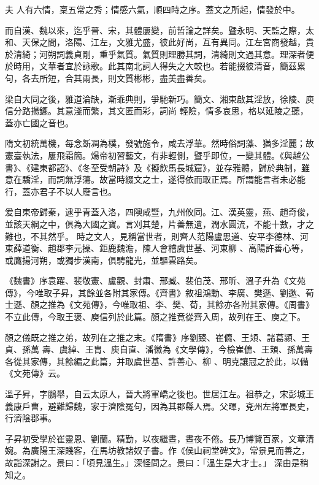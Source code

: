 \begin{pinyinscope}
 夫
 人有六情，稟五常之秀；情感六氣，順四時之序。蓋文之所起，情發於中。



 而自漢、魏以來，迄乎晉、宋，其體屢變，前哲論之詳矣。暨永明、天監之際，太和、天保之間，洛陽、江左，文雅尤盛，彼此好尚，互有異同。江左宮商發越，貴於清綺；河朔詞義貞剛，重乎氣質。氣質則理勝其詞，清綺則文過其意。理深者便於時用，文華者宜於詠歌。此其南北詞人得失之大較也。若能掇彼清音，簡茲累句，各去所短，合其兩長，則文質彬彬，盡美盡善矣。



 梁自大同之後，雅道淪缺，漸乖典則，爭馳新巧。簡文、湘東啟其淫放，徐陵、庾信分路揚鑣。其意淺而繁，其文匿而彩，詞尚
 輕險，情多哀思，格以延陵之聽，蓋亦亡國之音也。



 隋文初統萬機，每念斲凋為樸，發號施令，咸去浮華。然時俗詞藻、猶多淫麗；故憲臺執法，屢飛霜簡。煬帝初習藝文，有非輕側，暨乎即位，一變其體。《與越公書》、《建東都詔》、《冬至受朝詩》及《擬飲馬長城窟》，並存雅體，歸於典制，雖意在驕淫，而詞無浮蕩。故當時綴文之士，遂得依而取正焉。所謂能言者未必能行，蓋亦君子不以人廢言也。


爰自東帝歸秦，逮乎青蓋入洛，四隩咸暨，九州攸同。江、漢英靈，燕、趙奇俊，並該天綱之中，俱為大國之寶。言刈其楚，片善無遺，潤水圓流，不能十數，才之難也，不其然乎。
 時之文人，見稱當世者，則齊人范陽盧思道、安平李德林、河東薛道衡、趙郡李元操、鉅鹿魏澹，陳人會稽虞世基、河東柳
 、高陽許善心等，或鷹揚河朔，或獨步漢南，俱騁龍光，並驅雲路矣。



 《魏書》序袁躍、裴敬憲、盧觀、封肅、邢臧、裴伯茂、邢昕、溫子升為《文苑傳》，今唯取子昇，其餘並各附其家傳。《齊書》敘祖鴻勳、李廣、樊遜、劉逖、荀士遜、顏之推為《文苑傳》，今唯取祖、李、樊、荀，其餘亦各附其家傳。《周書》不立此傳，今取王褒、庾信列於此篇。顏之推竟從齊入周，故列在王、庾之下。


顏之儀既之推之弟，故列在之推之末。《隋書》序劉臻、崔儦、王頍、諸葛潁、王貞、孫萬
 壽、虞綽、王胄、庾自直、潘徽為《文學傳》，今檢崔儦、王頍、孫萬壽各從其家傳，其餘編之此篇，并取虞世基、許善心、柳
 、明克讓冠之於此，以備《文苑傳》云。



 溫子昇，字鵬舉，自云太原人，晉大將軍嶠之後也。世居江左。祖恭之，宋彭城王義康戶曹，避難歸魏，家于濟陰冤句，因為其郡縣人焉。父暉，兗州左將軍長史，行濟陰郡事。



 子昇初受學於崔靈恩、劉蘭。精勤，以夜繼晝，晝夜不倦。長乃博覽百家，文章清婉。為廣陽王深賤客，在馬坊教諸奴子書。作《侯山祠堂碑文》，常景見而善之，故詣深謝之。景曰：「頃見溫生。」深怪問之。景曰：「溫生是大才士。」
 深由是稍知之。




\end{pinyinscope}
